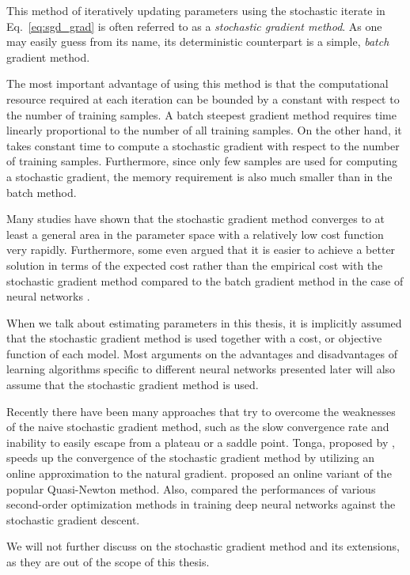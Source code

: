 \documentclass{now}
\begin{document}
This method of iteratively updating parameters using the
stochastic iterate in Eq.~\eqref{eq:sgd_grad} is often
referred to as a \textit{stochastic gradient method}. As one
may easily guess from its name, its deterministic
counterpart is a simple, \textit{batch} gradient method.

The most important advantage of using this method is that the
computational resource required at each iteration can be bounded
by a constant with respect to the number of training samples. A
batch steepest gradient method requires time linearly
proportional to the number of all training samples.  On the other
hand, it takes constant time to compute a stochastic gradient
with respect to the number of training samples. Furthermore,
since only few samples are used for computing a stochastic
gradient, the memory requirement is also much smaller than
in the batch method.

Many studies \citep[see, e.g.,][]{Bottou2008,Bottou2004}
have shown that the stochastic gradient method converges to
at least a general area in the parameter space with a
relatively low cost function very rapidly. Furthermore, some
even argued that it is easier to achieve a better solution
in terms of the expected cost rather than the empirical cost
with the stochastic gradient method compared to the batch
gradient method in the case of neural networks
\citep{Lecun1998a}.

When we talk about estimating parameters in this thesis, it is
implicitly assumed that the stochastic gradient method is used
together with a cost, or objective function of each model. Most
arguments on the advantages and disadvantages of learning
algorithms specific to different neural networks presented later
will also assume that the stochastic gradient method is used.

Recently there have been many approaches that try to
overcome the weaknesses of the naive stochastic gradient
method, such as the slow convergence rate and inability to
easily escape from a plateau or a saddle point.  Tonga,
proposed by \citet{Roux2008a}, speeds up the convergence of
the stochastic gradient method by utilizing an online
approximation to the natural gradient.
\citet{Schraudolph2007} proposed an online variant of the
popular Quasi-Newton method.
Also, \citet{Le2011} compared the performances of various
second-order optimization methods in training deep neural
networks against the stochastic gradient descent.

We will not further discuss on the stochastic
gradient method and its extensions, as they are out of the
scope of this thesis.
\end{document}
